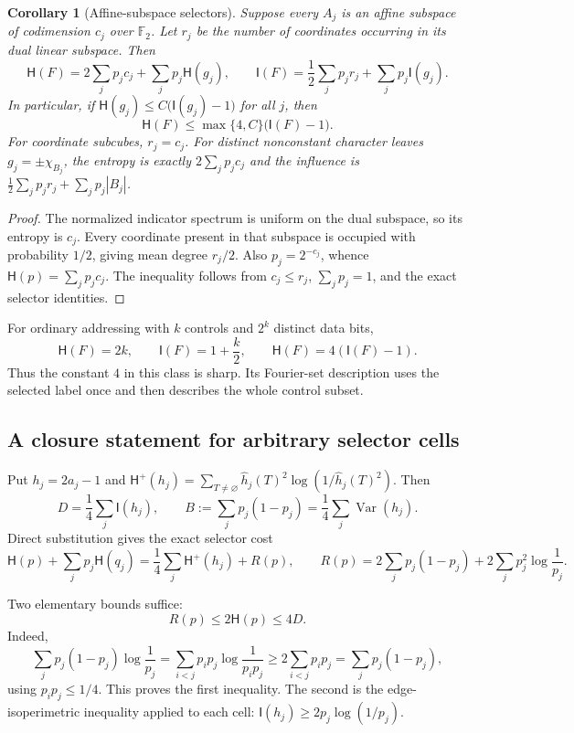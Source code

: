 \documentclass[11pt]{amsart}
\newtheorem{corollary}[theorem]{Corollary}
\theoremstyle{definition}
\theoremstyle{remark}
\newcommand{\HH}{\mathsf H}
\newcommand{\I}{\mathsf I}
\begin{document}
\begin{corollary}[Affine-subspace selectors]\label{cor:affine-selectors}
Suppose every $A_j$ is an affine subspace of codimension $c_j$ over
$\mathbb F_2$. Let $r_j$ be the number of coordinates occurring in its
dual linear subspace. Then
\[
 \HH(F)=2\sum_jp_jc_j+\sum_jp_j\HH(g_j),\qquad
 \I(F)=\frac12\sum_jp_jr_j+\sum_jp_j\I(g_j).
\]
In particular, if
$\HH(g_j)\le C\bigl(\I(g_j)-1\bigr)$ for all $j$, then
\[
 \HH(F)\le\max\{4,C\}\bigl(\I(F)-1\bigr).
\]
For coordinate subcubes, $r_j=c_j$. For distinct nonconstant character
leaves $g_j=\pm\chi_{B_j}$, the entropy is exactly
$2\sum_jp_jc_j$ and the influence is
$\frac12\sum_jp_jr_j+\sum_jp_j|B_j|$.
\end{corollary}
\begin{proof}
The normalized indicator spectrum is uniform on the dual subspace, so
its entropy is $c_j$. Every coordinate present in that subspace is
occupied with probability $1/2$, giving mean degree $r_j/2$.
Also $p_j=2^{-c_j}$, whence $\HH(p)=\sum_jp_jc_j$.
The inequality follows from $c_j\le r_j$, $\sum_jp_j=1$, and the exact
selector identities.
\end{proof}

For ordinary addressing with $k$ controls and $2^k$ distinct data bits,
\[
 \HH(F)=2k,\qquad \I(F)=1+\frac k2,\qquad \HH(F)=4(\I(F)-1).
\]
Thus the constant $4$ in this class is sharp. Its Fourier-set description
uses the selected label once and then describes the whole control subset.

\subsection{A closure statement for arbitrary selector cells}

Put $h_j=2a_j-1$ and
$\HH^+(h_j)=\sum_{T\ne\varnothing}\widehat h_j(T)^2
\log(1/\widehat h_j(T)^2)$. Then
\[
 D=\frac14\sum_j \I(h_j),\qquad
 B:=\sum_jp_j(1-p_j)=\frac14\sum_j\operatorname{Var}(h_j).
\]
Direct substitution gives the exact selector cost
\[
 \HH(p)+\sum_jp_j\HH(q_j)
   =\frac14\sum_j \HH^+(h_j)+R(p),\qquad
 R(p)=2\sum_jp_j(1-p_j)+2\sum_jp_j^2\log\frac1{p_j}.
\]

Two elementary bounds suffice:
\[
 R(p)\le 2\HH(p)\le 4D.
\]
Indeed,
\[
 \sum_jp_j(1-p_j)\log\frac1{p_j}
 =\sum_{i<j}p_ip_j\log\frac1{p_ip_j}
 \ge 2\sum_{i<j}p_ip_j=\sum_jp_j(1-p_j),
\]
using $p_ip_j\le1/4$. This proves the first inequality. The second is
the edge-isoperimetric inequality \cite{OD14} applied to each cell:
$\I(h_j)\ge2p_j\log(1/p_j)$.
\end{document}
